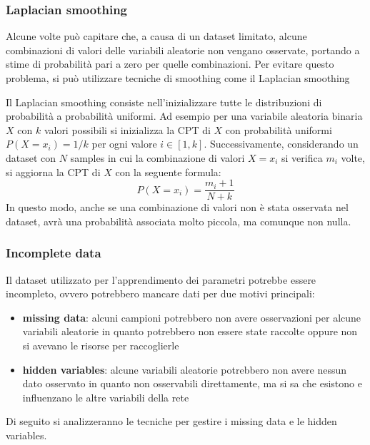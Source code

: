 \subsubsection*{Laplacian smoothing}
Alcune volte può capitare che, a causa di un dataset limitato, alcune combinazioni di valori delle variabili aleatorie non
vengano osservate, portando a stime di probabilità pari a zero per quelle combinazioni. Per evitare questo problema, si
può utilizzare tecniche di smoothing come il Laplacian smoothing

Il Laplacian smoothing consiste nell'inizializzare tutte le distribuzioni di probabilità a probabilità uniformi. Ad esempio
per una variabile aleatoria binaria \(X\) con \(k\) valori possibili si inizializza la CPT di \(X\) con probabilità uniformi
\(P(X = x_i) = 1/k\) per ogni valore \(i \in [1, k]\). Successivamente, considerando un dataset con \(N\) samples in cui
la combinazione di valori \(X = x_i\) si verifica \(m_i\) volte, si aggiorna la CPT di \(X\) con la seguente formula:
\[P(X = x_i) = \frac{m_i + 1}{N + k}\]
In questo modo, anche se una combinazione di valori non è stata osservata nel dataset, avrà una probabilità associata molto
piccola, ma comunque non nulla.

\subsubsection*{Incomplete data}
Il dataset utilizzato per l'apprendimento dei parametri potrebbe essere incompleto, ovvero potrebbero mancare dati per due
motivi principali:
\begin{itemize}
	\item \textbf{missing data}: alcuni campioni potrebbero non avere osservazioni per alcune variabili aleatorie in quanto
	potrebbero non essere state raccolte oppure non si avevano le risorse per raccoglierle
	\item \textbf{hidden variables}: alcune variabili aleatorie potrebbero non avere nessun dato osservato in quanto non
	osservabili direttamente, ma si sa che esistono e influenzano le altre variabili della rete
\end{itemize}
Di seguito si analizzeranno le tecniche per gestire i missing data e le hidden variables.

